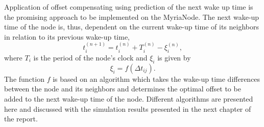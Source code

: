 \documentclass[a4paper,10pt]{report}
\begin{document}
Application of offset compensating using prediction of the next wake up time is the promising approach to be implemented on the MyriaNode. The next wake-up time of the node is, thus, dependent on the current wake-up time of its neighbors in relation to its previous wake-up time,
\begin{equation}
t_i^{(n+1)} = t_i^{(n)} + T_i^{(n)} - \xi_i^{(n)} ,
\end{equation}
where $T_i$ is the period of the node's clock and $\xi_i$ is given by
\begin{equation}
\xi_i = f(\Delta t_{ij}).
\end{equation}
The function $f$ is based on an algorithm which takes the wake-up time differences between the node and its neighbors and determines
the optimal offset to be added to the next wake-up time of the node. 
\newline Different algorithms are presented here and discussed with the simulation results presented in the next chapter of the report.\newline
\end{document}
